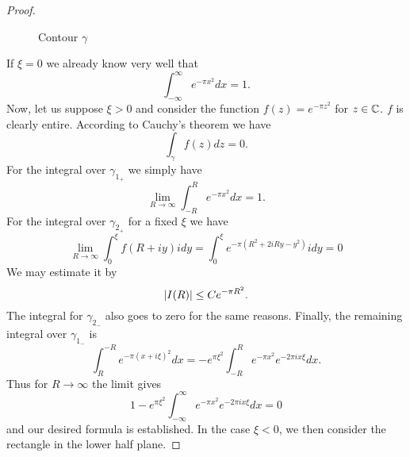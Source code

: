 \begin{proof}
\begin{figure}[!htb]
\begin{minipage}[c]{0.5\textwidth}
\end{minipage}
\caption{Contour $\gamma$}
\label{fig:ContourC}
\end{figure}
	If $\xi = 0$ we already know very well that
\begin{equation*}
	\int _{-\infty} ^\infty e^{-\pi x^2} dx = 1.
\end{equation*}
	Now, let us suppose $\xi > 0$ and consider the function $f(z) = e^{-\pi z^2}$ for $z \in \mathbb{C}$. $f$ is clearly entire. According to Cauchy's theorem we have
\begin{equation*}
	\int _{\gamma} f(z) dz = 0.
\end{equation*}
	For the integral over $\gamma_{1_+}$ we simply have
\begin{equation*}
	\lim _{R \to \infty} \int _{-R} ^R e^{-\pi x^2} dx = 1.
\end{equation*}
	For the integral over $\gamma_{2_+}$ for a fixed $\xi$ we have
\begin{equation*}
	\lim _{R \to \infty} \int _0 ^\xi f(R + i y) i dy = \int _0 ^\xi e^{-\pi (R^2 + 2iRy - y^2)} i dy = 0
\end{equation*}
	We may estimate it by
\begin{equation*}
	\left|I(R)\right| \leq Ce^{-\pi R^2}.
\end{equation*}
	The integral for $\gamma_{2_-}$ also goes to zero for the same reasons. Finally, the remaining integral over $\gamma_{1_-}$ is
\begin{equation*}
	\int _{R} ^{-R} e^{-\pi (x + i \xi)^2} dx = -e^{\pi \xi^2} \int _{-R} ^R e^{-\pi x^2} e^{-2 \pi i x \xi} dx.
\end{equation*}
	Thus for $R \to \infty$ the limit gives
\begin{equation*}
	1 - e^{\pi \xi^2} \int _{-\infty} ^{\infty} e^{-\pi x^2} e^{-2 \pi i x \xi} dx = 0
\end{equation*}
	and our desired formula is established. In the case $\xi < 0$, we then consider the rectangle in the lower half plane.
\end{proof}


